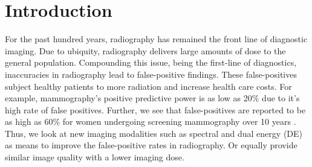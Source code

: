 \documentclass[a4paper,11pt]{article}
\begin{document}

\section{Introduction}

For the past hundred years, radiography has remained the front line of diagnostic imaging. Due to ubiquity, radiography delivers large amounts of dose to the general population. Compounding this issue, being the first-line of diagnostics, inaccuracies in radiography lead to false-positive findings. These false-positives subject healthy patients to more radiation and increase health care costs. For example, mammography's positive predictive power is as low as 20\% \cite{Skaane2013ProspectiveArbitration., Dickersin2010TheCancer, Kopans1992TheMammography., Mushlin1998EstimatingMeta-analysis, Chiarelli2013DigitalProgram} due to it's high rate of false positives. Further, we see that false-positives are reported to be as high as 60\% for women undergoing screening mammography over 10 years \cite{Kerlikowske2013OutcomesTherapy, Hubbard2011CumulativeMammography}. Thus, we look at new imaging modalities such as spectral and dual energy (DE) as means to improve the false-positive rates in radiography. Or equally provide similar image quality with a lower imaging dose.

\end{document}
